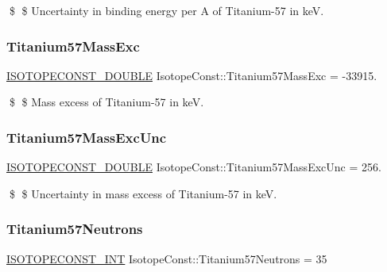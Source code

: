 \$ \$ Uncertainty in binding energy per A of Titanium-\/57 in keV. \mbox{\label{group___isotope_const-_titanium-_ti57_gae07cbe637db06dc238e3df63ca485c3d}} 
\subsubsection{\texorpdfstring{Titanium57\+Mass\+Exc}{Titanium57MassExc}}
{\footnotesize\ttfamily \mbox{\hyperlink{group___isotope_const-_macros_ga8f45a7272ce02c0b4c65c44636ed719a}{I\+S\+O\+T\+O\+P\+E\+C\+O\+N\+S\+T\+\_\+\+D\+O\+U\+B\+LE}} Isotope\+Const\+::\+Titanium57\+Mass\+Exc = -\/33915.}

\$ \$ Mass excess of Titanium-\/57 in keV. \mbox{\label{group___isotope_const-_titanium-_ti57_ga575b386116b7949d0199536908033218}} 
\subsubsection{\texorpdfstring{Titanium57\+Mass\+Exc\+Unc}{Titanium57MassExcUnc}}
{\footnotesize\ttfamily \mbox{\hyperlink{group___isotope_const-_macros_ga8f45a7272ce02c0b4c65c44636ed719a}{I\+S\+O\+T\+O\+P\+E\+C\+O\+N\+S\+T\+\_\+\+D\+O\+U\+B\+LE}} Isotope\+Const\+::\+Titanium57\+Mass\+Exc\+Unc = 256.}

\$ \$ Uncertainty in mass excess of Titanium-\/57 in keV. \mbox{\label{group___isotope_const-_titanium-_ti57_gac5ecba77e2884e314c5870fad3fb31ba}} 
\subsubsection{\texorpdfstring{Titanium57\+Neutrons}{Titanium57Neutrons}}
{\footnotesize\ttfamily \mbox{\hyperlink{group___isotope_const-_macros_ga5f18360b3e99483a35c32d789e62621c}{I\+S\+O\+T\+O\+P\+E\+C\+O\+N\+S\+T\+\_\+\+I\+NT}} Isotope\+Const\+::\+Titanium57\+Neutrons = 35}

